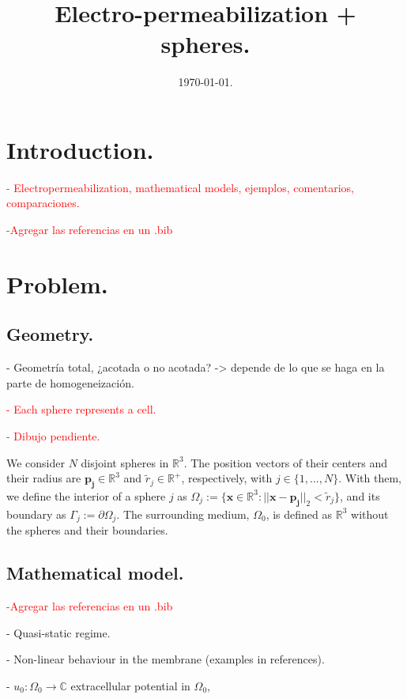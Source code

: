 \documentclass[]{article}%
\title{Electro-permeabilization + spheres.}
\date{\today .}
\begin{document}
\maketitle

\tableofcontents

\section{Introduction.}

\textcolor{red}{- Electropermeabilization, mathematical models, ejemplos, comentarios, comparaciones.}

\textcolor{red}{-Agregar las referencias en un .bib}

\section{Problem.}

\subsection{Geometry.}

\textcolor{}{- Geometr\'ia total, ¿acotada o no acotada? -> depende de lo que se haga en la parte de homogeneizaci\'on.}

\textcolor{red}{- Each sphere represents a cell.}

\textcolor{red}{- Dibujo pendiente.}

We consider $N$ disjoint spheres in $\mathbb{R}^3$. The position vectors of their centers and their radius are $\mathbf{p_j} \in \mathbb{R}^3$ and $\tilde{r}_j\in \mathbb{R}^+$, respectively, with $j \in \{1,...,N\}$. With them, we define the interior of a sphere $j$ as $\Omega_j:=\{ \mathbf{x} \in \mathbb{R}^3:||\mathbf{x}-\mathbf{p_j}||_2<\tilde{r}_j \}$, and its boundary as $\Gamma_j:=\partial \Omega_j$. The surrounding medium, $\Omega_0$, is defined as $\mathbb{R}^3$ without the spheres and their boundaries.

\subsection{Mathematical model.}

\textcolor{red}{-Agregar las referencias en un .bib}

- Quasi-static regime.

- Non-linear behaviour in the membrane (examples in references).

- $u_0: \Omega_0 \rightarrow \mathbb{C}$ extracellular potential in $\Omega_0$,
\end{document}

